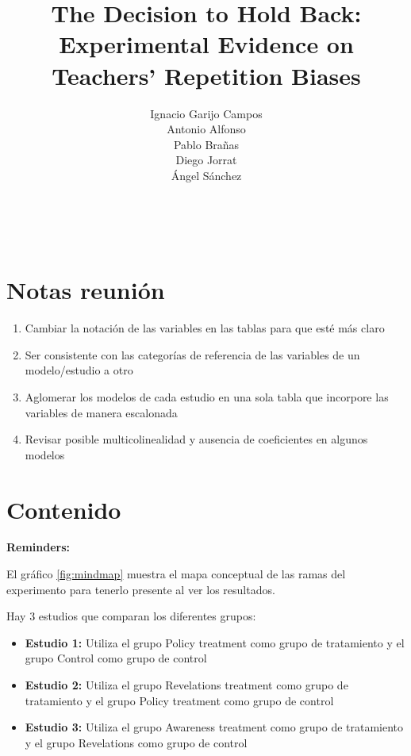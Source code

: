 \documentclass[12pt,a4]{article}
\begin{document}
	
	\title{The Decision to Hold Back: Experimental Evidence on Teachers’ Repetition Biases}
	
	
	\author{Ignacio Garijo Campos \\
	Antonio Alfonso \\
	Pablo Brañas \\
	Diego Jorrat \\
	Ángel Sánchez 
	}
	\maketitle
	
	\begin{abstract}
		
	\end{abstract}
	
	\newpage
	\textcolor{white}{.}
	
	\section{Notas reunión}
\begin{enumerate}
	\item Cambiar la notación de las variables en las tablas para que esté más claro
	\item Ser consistente con las categorías de referencia de las variables de un modelo/estudio a otro
	\item Aglomerar los modelos de cada estudio en una sola tabla que incorpore las variables de manera escalonada
	\item Revisar posible multicolinealidad y ausencia de coeficientes en algunos modelos
\end{enumerate}

\clearpage
	\section{Contenido}
	
	\textbf{Reminders:}
	
	El gráfico \ref{fig:mindmap} muestra el mapa conceptual de las ramas del experimento para tenerlo presente al ver los resultados. 
	
	Hay 3 estudios que comparan los diferentes grupos:
	
	\begin{itemize}
		\item \textbf{Estudio 1: } Utiliza el grupo Policy treatment como grupo de tratamiento y el grupo Control como grupo de control
		\item \textbf{Estudio 2: } Utiliza el grupo Revelations treatment como grupo de tratamiento y el grupo Policy treatment como grupo de control
		\item \textbf{Estudio 3: } Utiliza el grupo Awareness treatment como grupo de tratamiento y el grupo Revelations como grupo de control
	\end{itemize}
\end{document}

